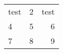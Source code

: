 \documentclass{article}
\begin{document}
\begin{tabular}{ l | c | r }
test & 2 & test \\
4 & 5 & 6 \\
7 & 8 & 9 \\
\end{tabular}
\end{document}
